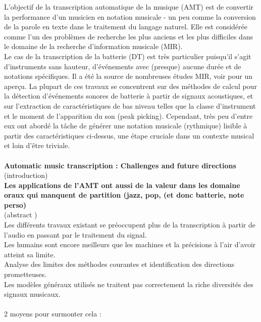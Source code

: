 L'objectif de la transcription automatique de la musique (AMT) \cite{article1} est de convertir la performance d'un musicien en notation musicale - un peu comme la conversion de la parole en texte dans le traitement du langage naturel. Elle est considérée comme l'un des problèmes de recherche les plus anciens et les plus difficiles dans le domaine de la recherche d'information musicale (MIR).\\
Le cas de la transcription de la batterie (DT) est très particulier puisqu'il s'agit d'instruments sans hauteur, d'événements avec (presque) aucune durée et de notations spécifiques. Il a été la source de nombreuses études MIR, voir \cite{8350302} pour un aperçu. La plupart de ces travaux se concentrent sur des méthodes de calcul pour la détection d'événements sonores de batterie à partir de signaux acoustiques, et sur l'extraction de caractéristiques de bas niveau telles que la classe d'instrument et le moment de l'apparition du son (peak picking). Cependant, très peu d'entre eux ont abordé la tâche de générer une notation musicale (rythmique) lisible à partir des caractéristiques ci-dessus, une étape cruciale dans un contexte musical et loin d'être triviale.\\\\
\textbf{Automatic music transcription : Challenges and future directions} \cite{article1}\\
(introduction\cite{article1})\\
\textbf{Les applications de l’AMT ont aussi de la valeur dans les domaine oraux qui manquent de partition (jazz, pop, (et donc batterie, note perso)}\\
(abstract \cite{article1})\\
Les différents travaux existant se préoccupent plus de la transcription à partir de l’audio en passant par le traitement du signal.\\
Les humains sont encore meilleurs que les machines et la précisions à l’air d’avoir atteint sa limite.\\
Analyse des limites des méthodes courantes et identification des directions prometteuses.\\
Les modèles généraux utilisés ne traitent pas correctement la riche diversités des signaux musicaux.\\\\
2 moyens pour surmonter cela :
